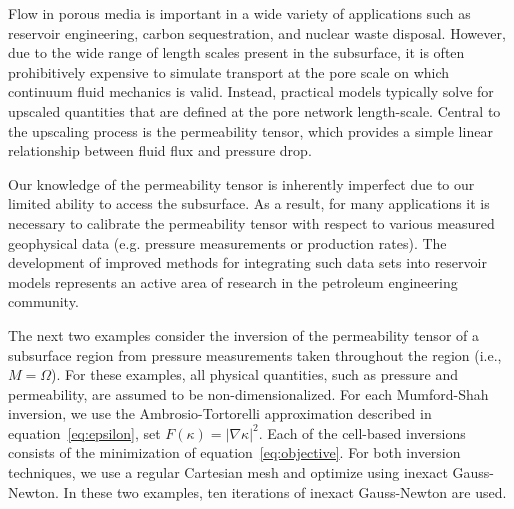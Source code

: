 \documentclass[manuscript,revised]{geophysics}
\begin{document}
Flow in porous media is important in a wide variety of applications such as reservoir engineering, carbon sequestration, and nuclear waste disposal.  However, due to the wide range of length scales present in the subsurface, it is often prohibitively expensive to simulate transport at the pore scale on which continuum fluid mechanics is valid.  Instead, practical models typically solve for upscaled quantities that are defined at the pore network length-scale.  Central to the upscaling process is the permeability tensor, which provides a simple linear relationship between fluid flux and pressure drop.

Our knowledge of the permeability tensor is inherently imperfect due to our limited ability to access the subsurface.  As a result, for many applications it is necessary to calibrate the permeability tensor with respect to various measured geophysical data (e.g. pressure measurements or production rates).  The development of improved methods for integrating such data sets into reservoir models represents an active area of research in the petroleum engineering community.  

The next two examples consider the inversion of the permeability tensor of a subsurface region from pressure measurements taken throughout the region (i.e., $M=\Omega$). For these examples, all physical quantities, such as pressure and permeability, are assumed to be non-dimensionalized.  For each Mumford-Shah inversion, we use the Ambrosio-Tortorelli approximation described in equation~\ref{eq:epsilon}, set $F(\kappa)=\left\vert \nabla \kappa \right\vert^2$.  Each of the cell-based inversions consists of the minimization of equation~\ref{eq:objective}.  For both inversion techniques, we use a regular Cartesian mesh and optimize using inexact Gauss-Newton.  In these two examples, ten iterations of inexact Gauss-Newton are used.  

\end{document}
